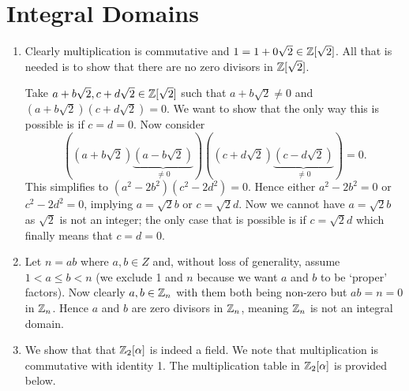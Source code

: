 \section{Integral Domains}
\begin{enumerate}
    \item Clearly multiplication is commutative and $1 = 1 + 0\sqrt2 \in \mathbb{Z}[\sqrt2]$. All that is needed is to show that there are no zero divisors in $\mathbb{Z}[\sqrt2]$.
    
    Take $a+b\sqrt2, c+d\sqrt2 \in \mathbb{Z}[\sqrt2]$ such that $a+b\sqrt2 \neq 0$ and $(a+b\sqrt2)(c+d\sqrt2) = 0$. We want to show that the only way this is possible is if $c = d = 0$. Now consider
    \[
        \left((a+b\sqrt2)\underbrace{(a-b\sqrt2)}_{\neq 0}\right)\left((c+d\sqrt2)\underbrace{(c-d\sqrt2)}_{\neq 0}\right) = 0.
    \]
    This simplifies to $(a^2-2b^2)(c^2-2d^2) = 0$. Hence either $a^2-2b^2 = 0$ or $c^2-2d^2 = 0$, implying $a = \sqrt2b$ or $c = \sqrt2d$. Now we cannot have $a = \sqrt2b$ as $\sqrt2$ is not an integer; the only case that is possible is if $c = \sqrt2d$ which finally means that $c = d = 0$.

    \item Let $n = ab$ where $a,b \in Z$ and, without loss of generality, assume $1 < a \leq b < n$ (we exclude 1 and $n$ because we want $a$ and $b$ to be `proper' factors). Now clearly $a, b \in \mathbb{Z}_{n}$ with them both being non-zero but $ab = n = 0$ in $\mathbb{Z}_{n}$. Hence $a$ and $b$ are zero divisors in $\mathbb{Z}_{n}$, meaning $\mathbb{Z}_{n}$ is not an integral domain.
    
    \item We show that that $\mathbb{Z}_{2}[\alpha]$ is indeed a field. We note that multiplication is commutative with identity 1. The multiplication table in $\mathbb{Z}_{2}[\alpha]$ is provided below.
    \begin{table}[h]
        \centering
    \end{table}


\end{enumerate}
